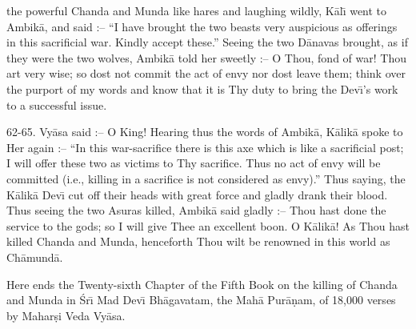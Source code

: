 the powerful Chanda and Munda like hares and laughing wildly, K\=al\={\i} went to Ambik\=a, and said :-- ``I have brought the two beasts very auspicious as offerings in this sacrificial war. Kindly accept these.'' Seeing the two D\=anavas brought, as if they were the two wolves, Ambik\=a told her sweetly :-- O Thou, fond of war! Thou art very wise; so dost not commit the act of envy nor dost leave them; think over the purport of my words and know that it is Thy duty to bring the Dev\={\i}'s work to a successful issue.

62-65. Vy\=asa said :-- O King! Hearing thus the words of Ambik\=a, K\=alik\=a spoke to Her again :-- ``In this war-sacrifice there is this axe which is like a sacrificial post; I will offer these two as victims to Thy sacrifice. Thus no act of envy will be committed (i.e., killing in a sacrifice is not considered as envy).'' Thus saying, the K\=alik\=a Dev\={\i} cut off their heads with great force and gladly drank their blood. Thus seeing the two Asuras killed, Ambik\=a said gladly :-- Thou hast done the service to the gods; so I will give Thee an excellent boon. O K\=alik\=a! As Thou hast killed Chanda and Munda, henceforth Thou wilt be renowned in this world as Ch\=amund\=a.

Here ends the Twenty-sixth Chapter of the Fifth Book on the killing of Chanda and Munda in \'Sr\={\i} Mad Dev\={\i} Bh\=agavatam, the Mah\=a Pur\=a\d{n}am, of 18,000 verses by Mahar\d{s}i Veda Vy\=asa.



